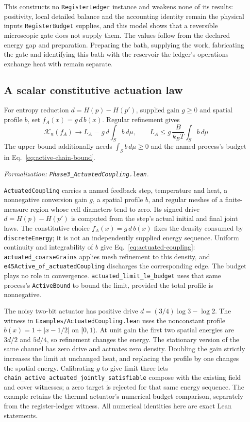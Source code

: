 \documentclass{article}
\begin{document}
This constructs no \texttt{RegisterLedger} instance and weakens none of its
results: positivity, local detailed balance and the accounting identity remain
the physical inputs \texttt{RegisterBudget} supplies, and this model shows that
a reversible microscopic gate does not supply them. The values follow from the
declared energy gap and preparation. Preparing the bath, supplying the work,
fabricating the gate and identifying this bath with the reservoir the ledger's
operations exchange heat with remain separate.

\subsection{A scalar constitutive actuation law}
\label{sec:supp-scalar}

For entropy reduction $d=H(p)-H(p')$, supplied gain $g\geq0$ and spatial profile $b$, set $f_A(x)=g\,d\,b(x)$. Regular refinement gives
\begin{equation}
 \mathcal{K}_n(f_A)\longrightarrow L_A=g\,d\int_S b\,d\mu,
 \qquad
 L_A\leq g\,\frac{B}{k_BT}\int_S b\,d\mu
 \label{eq:actuated-coupling}
\end{equation}
The upper bound additionally needs $\int_S b\,d\mu\geq0$ and the named process's budget in Eq.~\eqref{eq:active-chain-bound}.

\textit{Formalization: \nolinkurl{Phase3_ActuatedCoupling.lean}.}

\texttt{ActuatedCoupling} carries a named feedback step, temperature and heat,
a nonnegative conversion gain $g$, a spatial profile $b$, and regular meshes
of a finite-measure region whose cell diameters tend to zero. Its signed drive
$d=H(p)-H(p')$ is computed from the step's actual initial and final joint laws.
The constitutive choice $f_A(x)=g\,d\,b(x)$ fixes the density consumed by
\texttt{discreteEnergy}; it is not an independently supplied energy sequence.
Uniform continuity and integrability of $b$ give Eq.~\eqref{eq:actuated-coupling}:
\nolinkurl{actuated_coarseGrains} applies mesh refinement to this
density, and \nolinkurl{e45Active_of_actuatedCoupling}
discharges the corresponding edge. The budget plays no role in convergence.
\nolinkurl{actuated_limit_le_budget}
uses that same process's \texttt{ActiveBound} to bound the limit, provided the
total profile is nonnegative.

The noisy two-bit actuator has positive drive $d=(3/4)\log3-\log2$.
The witness in \nolinkurl{Examples/ActuatedCoupling.lean} uses the
nonconstant profile $b(x)=1+|x-1/2|$ on $[0,1)$.
At unit gain the first two spatial energies are
$3d/2$ and $5d/4$, so refinement changes the energy. The stationary version of
the same channel has zero drive and actuates zero density. Doubling the gain
strictly increases the limit at unchanged heat, and replacing the profile by
one changes the spatial energy. Calibrating $g$ to give limit three lets
\nolinkurl{chain_active_actuated_jointly_satisfiable}
compose with the existing field and cover witnesses; a zero target is
rejected for that same energy sequence. The example retains the thermal
actuator's numerical budget comparison, separately from the register-ledger
witness. All numerical identities here are exact Lean statements.
\end{document}
